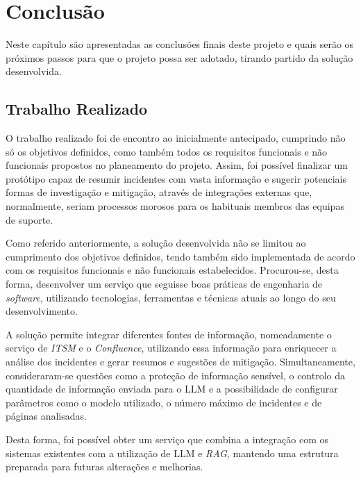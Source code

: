 
\chapter{Conclusão} %
\label{chap:Chapter8} %

	Neste capítulo são apresentadas as conclusões finais deste projeto e quais serão os próximos passos para que o projeto possa ser adotado, tirando partido da solução desenvolvida.

\section{Trabalho Realizado}
	
	O trabalho realizado foi de encontro ao inicialmente antecipado, cumprindo não só os objetivos definidos, como também todos os requisitos funcionais e não funcionais propostos no planeamento do projeto. Assim, foi possível finalizar um protótipo capaz de resumir incidentes com vasta informação e sugerir potenciais formas de investigação e mitigação, através de integrações externas que, normalmente, seriam processos morosos para os habituais membros das equipas de suporte.
	
	Como referido anteriormente, a solução desenvolvida não se limitou ao cumprimento dos objetivos definidos, tendo também sido implementada de acordo com os requisitos funcionais e não funcionais estabelecidos. Procurou-se, desta forma, desenvolver um serviço que seguisse boas práticas de engenharia de \textit{software}, utilizando tecnologias, ferramentas e técnicas atuais ao longo do seu desenvolvimento.
	
	A solução permite integrar diferentes fontes de informação, nomeadamente o serviço de \textit{ITSM} e o \textit{Confluence}, utilizando essa informação para enriquecer a análise dos incidentes e gerar resumos e sugestões de mitigação. Simultaneamente, consideraram-se questões como a proteção de informação sensível, o controlo da quantidade de informação enviada para o \gls{LLM} e a possibilidade de configurar parâmetros como o modelo utilizado, o número máximo de incidentes e de páginas analisadas.
	
	Desta forma, foi possível obter um serviço que combina a integração com os sistemas existentes com a utilização de \gls{LLM} e \textit{RAG}, mantendo uma estrutura preparada para futuras alterações e melhorias.
	

